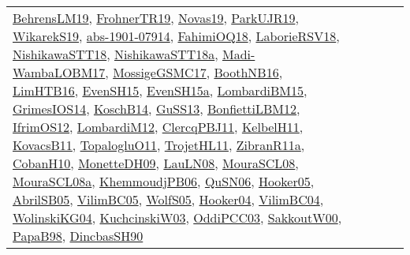 {\begin{longtable}{lp{3cm}>{\raggedright}p{6cm}>{\raggedright}p{6cm}p{8cm}}
\href{papers/BehrensLM19.pdf}{BehrensLM19}\cite{BehrensLM19}, \href{papers/FrohnerTR19.pdf}{FrohnerTR19}\cite{FrohnerTR19}, \href{articles/Novas19.pdf}{Novas19}\cite{Novas19}, \href{papers/ParkUJR19.pdf}{ParkUJR19}\cite{ParkUJR19}, \href{articles/WikarekS19.pdf}{WikarekS19}\cite{WikarekS19}, \href{articles/abs-1901-07914.pdf}{abs-1901-07914}\cite{abs-1901-07914}, \href{articles/FahimiOQ18.pdf}{FahimiOQ18}\cite{FahimiOQ18}, \href{articles/LaborieRSV18.pdf}{LaborieRSV18}\cite{LaborieRSV18}, \href{papers/NishikawaSTT18.pdf}{NishikawaSTT18}\cite{NishikawaSTT18}, \href{papers/NishikawaSTT18a.pdf}{NishikawaSTT18a}\cite{NishikawaSTT18a}, \href{papers/Madi-WambaLOBM17.pdf}{Madi-WambaLOBM17}\cite{Madi-WambaLOBM17}, \href{papers/MossigeGSMC17.pdf}{MossigeGSMC17}\cite{MossigeGSMC17}, \href{papers/BoothNB16.pdf}{BoothNB16}\cite{BoothNB16}, \href{papers/LimHTB16.pdf}{LimHTB16}\cite{LimHTB16}, \href{papers/EvenSH15.pdf}{EvenSH15}\cite{EvenSH15}, \href{articles/EvenSH15a.pdf}{EvenSH15a}\cite{EvenSH15a}, \href{papers/LombardiBM15.pdf}{LombardiBM15}\cite{LombardiBM15}, \href{articles/GrimesIOS14.pdf}{GrimesIOS14}\cite{GrimesIOS14}, \href{papers/KoschB14.pdf}{KoschB14}\cite{KoschB14}, \href{papers/GuSS13.pdf}{GuSS13}\cite{GuSS13}, \href{papers/BonfiettiLBM12.pdf}{BonfiettiLBM12}\cite{BonfiettiLBM12}, \href{papers/IfrimOS12.pdf}{IfrimOS12}\cite{IfrimOS12}, \href{articles/LombardiM12.pdf}{LombardiM12}\cite{LombardiM12}, \href{papers/ClercqPBJ11.pdf}{ClercqPBJ11}\cite{ClercqPBJ11}, \href{articles/KelbelH11.pdf}{KelbelH11}\cite{KelbelH11}, \href{articles/KovacsB11.pdf}{KovacsB11}\cite{KovacsB11}, \href{articles/TopalogluO11.pdf}{TopalogluO11}\cite{TopalogluO11}, \href{articles/TrojetHL11.pdf}{TrojetHL11}\cite{TrojetHL11}, \href{papers/ZibranR11a.pdf}{ZibranR11a}\cite{ZibranR11a}, \href{papers/CobanH10.pdf}{CobanH10}\cite{CobanH10}, \href{papers/MonetteDH09.pdf}{MonetteDH09}\cite{MonetteDH09}, \href{papers/LauLN08.pdf}{LauLN08}\cite{LauLN08}, \href{papers/MouraSCL08.pdf}{MouraSCL08}\cite{MouraSCL08}, \href{papers/MouraSCL08a.pdf}{MouraSCL08a}\cite{MouraSCL08a}, \href{papers/KhemmoudjPB06.pdf}{KhemmoudjPB06}\cite{KhemmoudjPB06}, \href{papers/QuSN06.pdf}{QuSN06}\cite{QuSN06}, \href{articles/Hooker05.pdf}{Hooker05}\cite{Hooker05}, \href{papers/AbrilSB05.pdf}{AbrilSB05}\cite{AbrilSB05}, \href{articles/VilimBC05.pdf}{VilimBC05}\cite{VilimBC05}, \href{papers/WolfS05.pdf}{WolfS05}\cite{WolfS05}, \href{papers/Hooker04.pdf}{Hooker04}\cite{Hooker04}, \href{papers/VilimBC04.pdf}{VilimBC04}\cite{VilimBC04}, \href{papers/WolinskiKG04.pdf}{WolinskiKG04}\cite{WolinskiKG04}, \href{articles/KuchcinskiW03.pdf}{KuchcinskiW03}\cite{KuchcinskiW03}, \href{papers/OddiPCC03.pdf}{OddiPCC03}\cite{OddiPCC03}, \href{articles/SakkoutW00.pdf}{SakkoutW00}\cite{SakkoutW00}, \href{articles/PapaB98.pdf}{PapaB98}\cite{PapaB98}, \href{articles/DincbasSH90.pdf}{DincbasSH90}\cite{DincbasSH90}\\

\end{longtable}}
